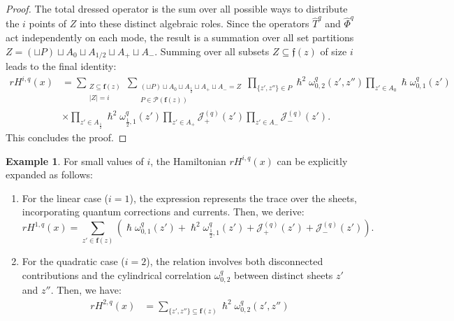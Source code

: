 \documentclass[reqno,11pt]{amsart}
\theoremstyle{plain}
\theoremstyle{definition}
\newtheorem{example}[theorem]{Example}
\theoremstyle{remark}
\numberwithin{equation}{section}
\newcommand{\1}{\mathds{1}}
\newcommand{\2}{\frac{1}{2}}
\begin{document}
{\begin{proof}
									{The total dressed operator is the sum over all possible ways to distribute the $i$ points of $Z$ into these distinct algebraic roles. Since the operators $\hat{T}^q$ and $\hat{\Phi}^q$ act independently on each mode, the result is a summation over all set partitions $Z = (\sqcup P) \sqcup A_0 \sqcup A_{1/2} \sqcup A_+ \sqcup A_-$. Summing over all subsets $Z \subseteq \mathfrak{f}(z)$ of size $i$ leads to the final identity:
										\begin{align}
											rH^{i,q}(x) 
											&= \sum_{\substack{Z \subseteq \mathbf{f}(z)\\ |Z| = i}} 
											\sum_{\substack{(\sqcup P) \sqcup A_0 \sqcup A_{\frac{1}{2}} \sqcup A_+ \sqcup A_- = Z \\ P \in \mathcal{P}(\mathbf{f}(z))}}
											\prod_{\{ z', z''\} \in P} \hslash^2 \omega^{q}_{0,2}(z',z'') 
											\prod_{z' \in A_0} \hslash \omega^{q}_{0,1} (z') \nonumber \\
											&\times \prod_{z' \in A_{\frac{1}{2}}} \hslash^2 \omega^{q}_{\frac{1}{2},1}(z') 
											\prod_{z' \in A_+} \mathcal{J}^{(q)}_{+} (z') 
											\prod_{z' \in A_-} \mathcal{J}^{(q)}_{-} (z').
										\end{align}
										This concludes the proof.}
								\end{proof}
								\begin{example}
									{For small values of $i$, the Hamiltonian $rH^{i,q}(x)$ can be explicitly expanded as follows:
										\begin{enumerate}
											\item [(i)]{For the linear case ($i=1$)}, the expression represents the trace over the sheets, incorporating quantum corrections and currents. Then, we derive:
											\begin{equation}
												rH^{1,q}(x) = \sum_{z' \in \mathbf{f}(z)} \left( \hslash \omega^q_{0,1}(z') + \hslash^2 \omega^q_{\frac{1}{2},1}(z') + \mathcal{J}^{(q)}_{+}(z') + \mathcal{J}^{(q)}_{-}(z') \right).
											\end{equation}
											\item [(ii)]{For the quadratic case ($i=2$)}, 
											the relation involves both disconnected contributions and the cylindrical correlation $\omega^q_{0,2}$ between distinct sheets $z'$ and $z''$. Then, we have:
											\begin{align}
												rH^{2,q}(x) &= \sum_{\{z', z''\} \subseteq \mathbf{f}(z)} \hslash^2 \omega^{q}_{0,2}(z',z'') \nonumber \\

\end{align}
\end{enumerate}}
\end{example}}
\end{document}
